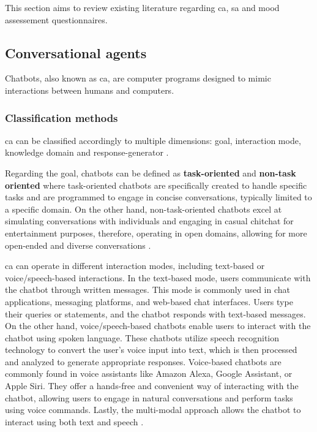 \documentclass[a4paper,fleqn]{cas-dc}
\begin{document}
This section aims to review existing literature regarding \gls{ca}, \gls{sa} and mood assessement questionnaires.

\subsection{Conversational agents}
\label{conversationalAgents}

Chatbots, also known as \gls{ca}, are computer programs designed to mimic interactions between humans and computers.

\subsubsection{Classification methods}

\gls{ca} can be classified accordingly to multiple dimensions: goal, interaction mode, knowledge domain and response-generator \cite{hussain_survey_2019}.

Regarding the goal, chatbots can be defined as \textbf{task-oriented} and \textbf{non-task oriented} where task-oriented chatbots are specifically created to handle specific tasks and are programmed to engage in concise conversations, typically limited to a specific domain. On the other hand, non-task-oriented chatbots excel at simulating conversations with individuals and engaging in casual chitchat for entertainment purposes, therefore, operating in open domains, allowing for more open-ended and diverse conversations \cite{hussain_survey_2019}.

\gls{ca} can operate in different interaction modes, including text-based or voice/speech-based interactions. In the text-based mode, users communicate with the chatbot through written messages. This mode is commonly used in chat applications, messaging platforms, and web-based chat interfaces. Users type their queries or statements, and the chatbot responds with text-based messages. On the other hand, voice/speech-based chatbots enable users to interact with the chatbot using spoken language. These chatbots utilize speech recognition technology to convert the user's voice input into text, which is then processed and analyzed to generate appropriate responses. Voice-based chatbots are commonly found in voice assistants like Amazon Alexa, Google Assistant, or Apple Siri. They offer a hands-free and convenient way of interacting with the chatbot, allowing users to engage in natural conversations and perform tasks using voice commands. Lastly, the multi-modal approach allows the chatbot to interact using both text and speech \cite{montenegro_survey_2019}.
\end{document}
